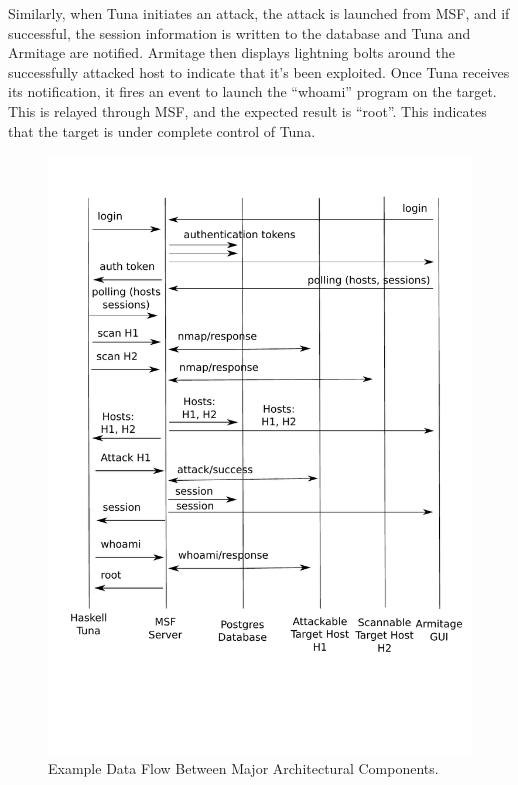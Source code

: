 \documentclass[figure,letterpaper,onefignum]{mysiam}
\begin{document}
Similarly, when Tuna initiates an attack, the attack is launched from MSF, and if successful, the session information is written to the database and Tuna and Armitage are notified. Armitage then displays lightning bolts around the successfully attacked host to indicate that it's been exploited. Once Tuna receives its notification, it fires an event to launch the ``whoami'' program on the target. This is relayed through MSF, and the expected result is ``root''. This indicates that the target is under complete control of Tuna.

\begin{figure}[h!]
  \caption{Example Data Flow Between Major Architectural Components.}
  \label{dataFlowFig}
  \centering
     \includegraphics[scale=0.5]{serviceDiagram.pdf}
\end{figure}

%
%
\end{document}
